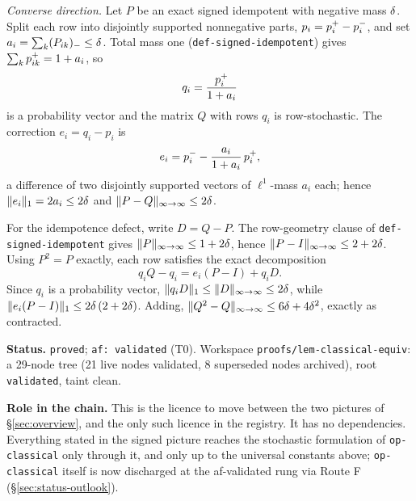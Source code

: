 \emph{Converse direction.} Let $P$ be an exact signed idempotent with negative mass
$\delta$. Split each row into disjointly supported nonnegative parts,
$p_i=p_i^{+}-p_i^{-}$, and set $a_i=\sum_k(P_{ik})_-\le\delta$. Total mass one
(\texttt{def-signed-idempotent}) gives $\sum_kp_{ik}^{+}=1+a_i$, so
\[
  q_i=\frac{p_i^{+}}{1+a_i}
\]
is a probability vector and the matrix $Q$ with rows $q_i$ is row-stochastic. The
correction $e_i=q_i-p_i$ is
\[
  e_i=p_i^{-}-\frac{a_i}{1+a_i}\,p_i^{+},
\]
a difference of two disjointly supported vectors of $\ell^1$-mass $a_i$ each; hence
$\lVert e_i \rVert_{1}=2a_i\le2\delta$ and $\lVert P-Q \rVert_{\infty\to\infty}\le2\delta$.

For the idempotence defect, write $D=Q-P$. The row-geometry clause of
\texttt{def-signed-idempotent} gives $\lVert P \rVert_{\infty\to\infty}\le1+2\delta$, hence
$\lVert P-I \rVert_{\infty\to\infty}\le2+2\delta$. Using $P^2=P$ exactly, each row satisfies the exact
decomposition
\begin{equation}\label{eq:ce-defect}
  q_iQ-q_i=e_i(P-I)+q_iD .
\end{equation}
Since $q_i$ is a probability vector, $\lVert q_iD \rVert_{1}\le\lVert D \rVert_{\infty\to\infty}\le2\delta$, while
$\lVert e_i(P-I) \rVert_{1}\le2\delta\,(2+2\delta)$. Adding,
$\lVert Q^2-Q \rVert_{\infty\to\infty}\le6\delta+4\delta^2$, exactly as contracted.

\medskip
\noindent\textbf{Status.} \texttt{proved}; \texttt{af: validated} (T0). Workspace
\texttt{proofs/lem-classical-equiv}: a 29-node tree (21 live nodes validated, 8
superseded nodes archived), root \texttt{validated}, taint clean.

\noindent\textbf{Role in the chain.} This is the licence to move between the two
pictures of \S\ref{sec:overview}, and the only such licence in the registry. It has no
dependencies. Everything stated in the signed picture reaches the stochastic
formulation of \texttt{op-classical} only through it, and only up to the universal
constants above; \texttt{op-classical} itself is now discharged at the af-validated rung via Route F (\S\ref{sec:status-outlook}).
